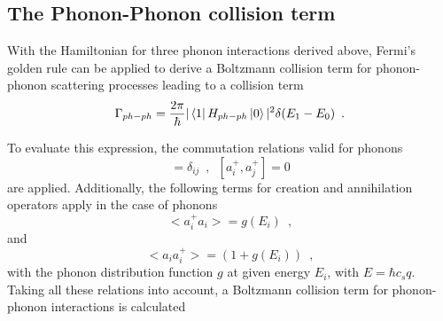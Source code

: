 \documentclass[ aps, prb, reprint, groupedaddress]{revtex4-1}
\begin{document}
\subsection{The Phonon-Phonon collision term}

With the Hamiltonian for three phonon interactions derived above, Fermi's golden rule can be applied to derive a Boltzmann collision term for phonon-phonon scattering processes
leading to a collision term
\begin{equation}
\Gamma_{ph-ph}=\frac{2\pi}{\hbar}|\bra 1  H_{ph-ph} \ket 0|^2 \delta (E_1 - E_0) \enspace .
\end{equation}

To evaluate this expression, the commutation relations valid for phonons
\begin{equation}
[a_i,a_j^+]=\delta_{ij} \enspace , \enspace [a_i^+,a_j^+]=0 
\end{equation}
are applied.
Additionally, the following terms for creation and annihilation operators apply in the case of phonons
\begin{equation}
<a_i^+a_i>=g(E_i) \enspace ,
\end{equation}
and
\begin{equation}
<a_i a_i^+>=(1+g(E_i)) \enspace ,
\end{equation}
with the phonon distribution function $g$ at given energy $E_i$, with $E=\hbar c_s q$.
Taking all these relations into account, a Boltzmann collision term for phonon-phonon interactions is calculated
\end{document}
